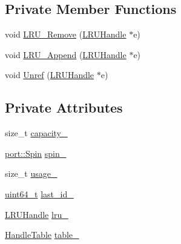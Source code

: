 \subsection*{Private Member Functions}
\begin{DoxyCompactItemize}
\item 
void \hyperlink{classleveldb_1_1anonymous__namespace_02cache_8cc_03_1_1_l_r_u_cache_a9baa1e28b060376e2f0144f9c5a64c15}{L\+R\+U\+\_\+\+Remove} (\hyperlink{structleveldb_1_1anonymous__namespace_02cache_8cc_03_1_1_l_r_u_handle}{L\+R\+U\+Handle} $\ast$e)
\item 
void \hyperlink{classleveldb_1_1anonymous__namespace_02cache_8cc_03_1_1_l_r_u_cache_af76fa0934136156afd837e41f2428d33}{L\+R\+U\+\_\+\+Append} (\hyperlink{structleveldb_1_1anonymous__namespace_02cache_8cc_03_1_1_l_r_u_handle}{L\+R\+U\+Handle} $\ast$e)
\item 
void \hyperlink{classleveldb_1_1anonymous__namespace_02cache_8cc_03_1_1_l_r_u_cache_a7c3f4bfc3a40fefc0723d47bfa5db406}{Unref} (\hyperlink{structleveldb_1_1anonymous__namespace_02cache_8cc_03_1_1_l_r_u_handle}{L\+R\+U\+Handle} $\ast$e)
\end{DoxyCompactItemize}
\subsection*{Private Attributes}
\begin{DoxyCompactItemize}
\item 
size\+\_\+t \hyperlink{classleveldb_1_1anonymous__namespace_02cache_8cc_03_1_1_l_r_u_cache_a49853be06e4ef5f0ae85489ebaeedbc6}{capacity\+\_\+}
\item 
\hyperlink{namespaceleveldb_1_1port_a3017c82209c2da44f142ef633e012149}{port\+::\+Spin} \hyperlink{classleveldb_1_1anonymous__namespace_02cache_8cc_03_1_1_l_r_u_cache_ae9cb64aa63131075c5bb495fd19b28b1}{spin\+\_\+}
\item 
size\+\_\+t \hyperlink{classleveldb_1_1anonymous__namespace_02cache_8cc_03_1_1_l_r_u_cache_a241e9760171e0d9c991fee2be57b555c}{usage\+\_\+}
\item 
\hyperlink{stdint_8h_aaa5d1cd013383c889537491c3cfd9aad}{uint64\+\_\+t} \hyperlink{classleveldb_1_1anonymous__namespace_02cache_8cc_03_1_1_l_r_u_cache_ac42b5dd83d54b62f2184dbdd7e7c3a26}{last\+\_\+id\+\_\+}
\item 
\hyperlink{structleveldb_1_1anonymous__namespace_02cache_8cc_03_1_1_l_r_u_handle}{L\+R\+U\+Handle} \hyperlink{classleveldb_1_1anonymous__namespace_02cache_8cc_03_1_1_l_r_u_cache_a23ab8fa729860c0ef02bcf53e48d867c}{lru\+\_\+}
\item 
\hyperlink{classleveldb_1_1anonymous__namespace_02cache_8cc_03_1_1_handle_table}{Handle\+Table} \hyperlink{classleveldb_1_1anonymous__namespace_02cache_8cc_03_1_1_l_r_u_cache_a229a9161c1b6b719b9a4c99572a49ae9}{table\+\_\+}
\end{DoxyCompactItemize}


